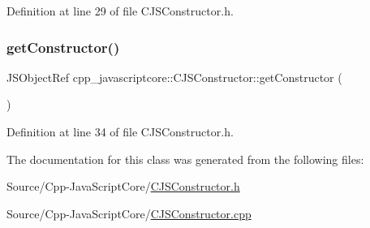Definition at line 29 of file C\+J\+S\+Constructor.\+h.

\mbox{\label{classcpp__javascriptcore_1_1_c_j_s_constructor_ad2fabad070c8a98d05c56bbc83f0705a}} 
\subsubsection{\texorpdfstring{get\+Constructor()}{getConstructor()}}
{\footnotesize\ttfamily J\+S\+Object\+Ref cpp\+\_\+javascriptcore\+::\+C\+J\+S\+Constructor\+::get\+Constructor (\begin{DoxyParamCaption}{ }\end{DoxyParamCaption})\hspace{0.3cm}{\ttfamily [inline]}}



Definition at line 34 of file C\+J\+S\+Constructor.\+h.



The documentation for this class was generated from the following files\+:\begin{DoxyCompactItemize}
\item 
Source/\+Cpp-\/\+Java\+Script\+Core/\mbox{\hyperlink{_c_j_s_constructor_8h}{C\+J\+S\+Constructor.\+h}}\item 
Source/\+Cpp-\/\+Java\+Script\+Core/\mbox{\hyperlink{_c_j_s_constructor_8cpp}{C\+J\+S\+Constructor.\+cpp}}\end{DoxyCompactItemize}
